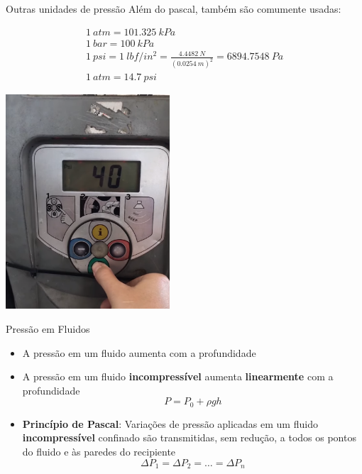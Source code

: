 \begin{frame}{Outras unidades de pressão}
    Além do pascal, também são comumente usadas:
    \begin{fleqn}
        \begin{gather*}
            \SI{1}{atm} = \SI{101.325}{kPa} \\
            \SI{1}{bar} = \SI{100}{kPa} \\
            \SI{1}{psi} = \SI{1}{lbf/in^2} = \frac{\SI{4.4482}{N}}{(\SI{0.0254}{m})^2} =
            \SI{6894.7548}{Pa} \\
            \SI{1}{atm} = \SI{14.7}{psi}
        \end{gather*}
    \end{fleqn}
\end{frame}

\begin{frame}{}
    \begin{center}
        \includegraphics[height=8cm]{images/psi.png}
    \end{center}
\end{frame}

\begin{frame}{Pressão em Fluidos}
    \begin{itemize}
        \item A pressão em um fluido aumenta com a profundidade
        \item A pressão em um fluido \textbf{incompressível} aumenta \textbf{linearmente} com a profundidade
            \[
                P=P_0 + \rho g h
            \]
        \item \textbf{Princípio de Pascal}: Variações de pressão aplicadas em
            um fluido \textbf{incompressível} confinado são transmitidas, sem
            redução, a todos os pontos do fluido e às paredes do recipiente
            \[
                \Delta P_1 = \Delta P_2 = \ldots = \Delta P_n
            \]
    \end{itemize}
\end{frame}

